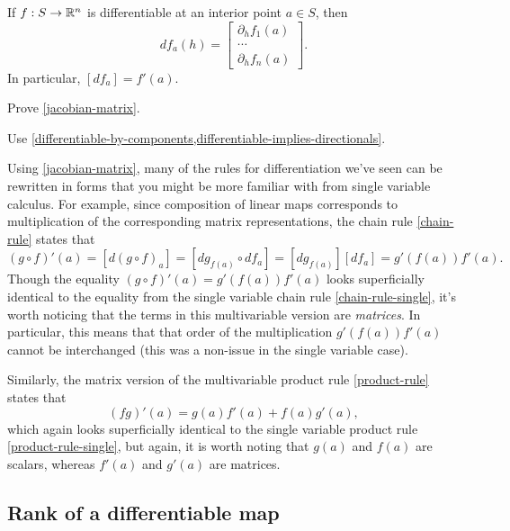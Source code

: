 \begin{theorem} \label{jacobian-matrix}
	If $f : S \to \mathbb{R}^n$ is differentiable at an interior point $a \in S$, then \[ df_a(h) = \begin{bmatrix} \partial_h f_1(a) \\ \cdots \\ \partial_h f_n(a) \end{bmatrix}. \]
	In particular, $[df_a] = f'(a)$. 
\end{theorem}

\begin{exercise}
	Prove \cref{jacobian-matrix}. \begin{hint} Use \cref{differentiable-by-components,differentiable-implies-directionals}. \end{hint}
\end{exercise}

Using \cref{jacobian-matrix}, many of the rules for differentiation we've seen can be rewritten in forms that you might be more familiar with from single variable calculus. For example, since composition of linear maps corresponds to multiplication of the corresponding matrix representations, the chain rule \ref{chain-rule} states that 
\[ (g \circ f)'(a) = [d(g \circ f)_a] = [dg_{f(a)} \circ df_a] = [dg_{f(a)}] [df_a] = g'(f(a)) f'(a). \]
Though the equality $(g \circ f)'(a) = g'(f(a)) f'(a)$ looks superficially identical to the equality from the single variable chain rule \ref{chain-rule-single}, it's worth noticing that the terms in this multivariable version are \emph{matrices}. In particular, this means that that order of the multiplication $g'(f(a))f'(a)$ cannot be interchanged (this was a non-issue in the single variable case). 

Similarly, the matrix version of the multivariable product rule \ref{product-rule} states that 
\[ (fg)'(a) = g(a)f'(a) + f(a)g'(a), \]
which again looks superficially identical to the single variable product rule \ref{product-rule-single}, but again, it is worth noting that $g(a)$ and $f(a)$ are scalars, whereas $f'(a)$ and $g'(a)$ are matrices. 

\subsection{Rank of a differentiable map}

